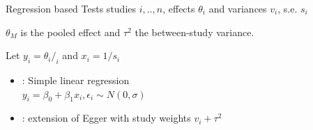 \documentclass[english]{beamer}\usepackage[]{graphicx}\usepackage[]{color}
\begin{document}
% 
% 
% 
% 
% 
% 
% 
% 
% 


\begin{frame}{Regression based Tests}
studies $i,.. ,n$, effects $\theta_i$ and variances $v_i$, s.e. $s_i$

$\theta_M$ is the pooled effect and $\tau^2$ the between-study variance.

Let $y_{i} = \theta_{i}/_{i}$ and $x_i = 1/s_i$
\begin{itemize}
\item \citet{Egger} : Simple linear regression \\ $y_i = \beta_0 + \beta_1 x_i, \epsilon_i \sim N(0, \sigma)$
\item \citet{thompson.sharp} : extension of Egger with study weights $v_{i} + \tau^2$ 
\end{itemize}

\end{frame}
\end{document}
